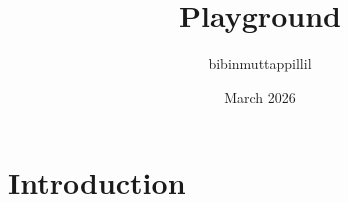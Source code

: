 \documentclass{article}
\title{Playground}
\author{bibinmuttappillil }
\date{March 2026}
\begin{document}
\maketitle

\section{Introduction}



\end{document}
